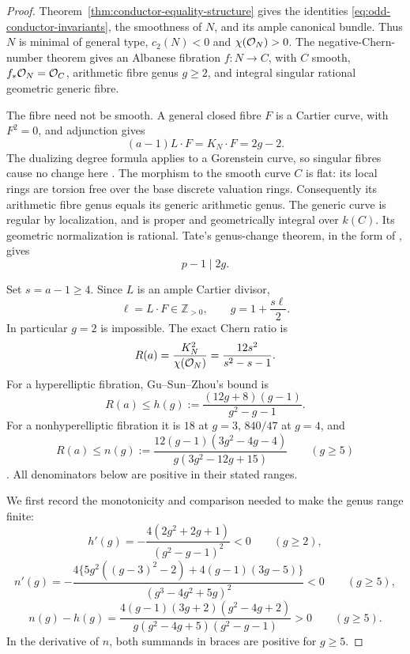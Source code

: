 \begin{proof}
Theorem~\ref{thm:conductor-equality-structure} gives the identities
\eqref{eq:odd-conductor-invariants}, the smoothness of $N$, and its
ample canonical bundle. Thus $N$ is minimal of general type,
$c_2(N)<0$ and $\chi(\mathcal O_N)>0$.
The negative-Chern-number theorem
\cite[Theorems~2 and~7 and their proofs, pp.~264--266]{ShepherdBarronGeography}
gives an Albanese fibration $f:N\to C$, with $C$ smooth,
$f_*\mathcal O_N=\mathcal O_C$, arithmetic fibre genus $g\geq2$, and
integral singular rational geometric generic fibre.

The fibre need not be smooth. A general closed fibre $F$ is a
Cartier curve, with $F^2=0$, and adjunction gives
\[
 (a-1)L\cdot F=K_N\cdot F=2g-2.
\]
The dualizing degree formula applies to a Gorenstein curve, so
singular fibres cause no change here
\cite[Tags~0B4A, 0C19 and~0BS6]{Stacks}.
The morphism to the smooth curve $C$ is flat: its local rings
are torsion free over the base discrete valuation rings.
Consequently its arithmetic fibre genus equals its generic
arithmetic genus. The generic curve is regular by localization,
and is proper and geometrically integral over $k(C)$.
Its geometric normalization is rational. Tate's genus-change
theorem, in the form of
\cite[Corollary~2.3, author p.~4]{SchroerGenusChange}, gives
\[
 p-1\mid2g.
\]

Set $s=a-1\geq4$. Since $L$ is an ample Cartier divisor,
\begin{equation}\label{eq:odd-conductor-integer-fibre-degree}
 \ell=L\cdot F\in\mathbb Z_{>0},\qquad
 g=1+\frac{s\ell}{2}.
\end{equation}
In particular $g=2$ is impossible. The exact Chern ratio is
\[
 R(a)=\frac{K_N^2}{\chi(\mathcal O_N)}
      =\frac{12s^2}{s^2-s-1}.
\]
For a hyperelliptic fibration, Gu--Sun--Zhou's bound is
\[
 R(a)\leq h(g):=
 \frac{(12g+8)(g-1)}{g^2-g-1}.
\]
For a nonhyperelliptic fibration it is $18$ at $g=3$,
$840/47$ at $g=4$, and
\[
 R(a)\leq n(g):=
 \frac{12(g-1)(3g^2-4g-4)}{g(3g^2-12g+15)}
 \qquad(g\geq5)
\]
\cite[Theorem~3.2 and its proof, pp.~622--623]{GuSunZhou}.
All denominators below are positive in their stated ranges.

We first record the monotonicity and comparison needed to make
the genus range finite:
\[
 h'(g)=-\frac{4(2g^2+2g+1)}{(g^2-g-1)^2}<0
 \qquad(g\geq2),
\]
\[
 n'(g)=-\frac{4\{5g^2((g-3)^2-2)+4(g-1)(3g-5)\}}
 {(g^3-4g^2+5g)^2}<0
 \qquad(g\geq5),
\]
\[
 n(g)-h(g)=
 \frac{4(g-1)(3g+2)(g^2-4g+2)}
 {g(g^2-4g+5)(g^2-g-1)}>0
 \qquad(g\geq5).
\]
In the derivative of $n$, both summands in braces are positive
for $g\geq5$.


\end{proof}
